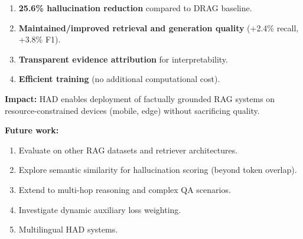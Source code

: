 \documentclass[11pt,a4paper]{article}
\begin{document}
\begin{enumerate}
    \item \textbf{25.6\% hallucination reduction} compared to DRAG baseline.
    \item \textbf{Maintained/improved retrieval and generation quality} (+2.4\% recall, +3.8\% F1).
    \item \textbf{Transparent evidence attribution} for interpretability.
    \item \textbf{Efficient training} (no additional computational cost).
\end{enumerate}

\textbf{Impact:} HAD enables deployment of factually grounded RAG systems on resource-constrained devices (mobile, edge) without sacrificing quality.

\textbf{Future work:}
\begin{enumerate}
    \item Evaluate on other RAG datasets and retriever architectures.
    \item Explore semantic similarity for hallucination scoring (beyond token overlap).
    \item Extend to multi-hop reasoning and complex QA scenarios.
    \item Investigate dynamic auxiliary loss weighting.
    \item Multilingual HAD systems.
\end{enumerate}


\end{document}
